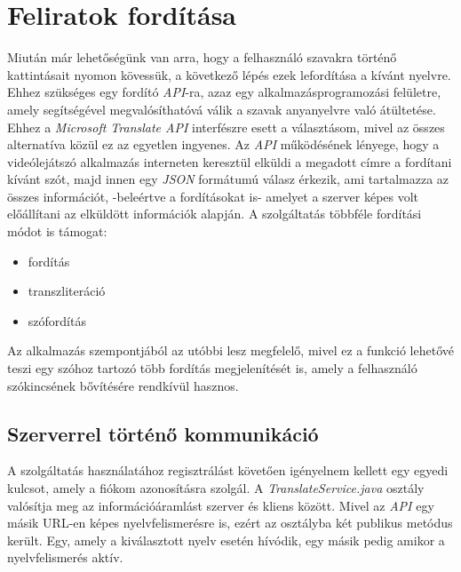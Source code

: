 \section{Feliratok fordítása}

Miután már lehetőségünk van arra, hogy a felhasználó szavakra történő kattintásait nyomon kövessük, a következő lépés ezek lefordítása a kívánt nyelvre. Ehhez szükséges egy fordító \textit{API}-ra, azaz egy alkalmazásprogramozási felületre, amely segítségével megvalósíthatóvá válik a szavak anyanyelvre való átültetése. Ehhez a \textit{Microsoft Translate API} interfészre esett a választásom, mivel az összes alternatíva közül ez az egyetlen ingyenes. Az \textit{API} működésének lényege, hogy a videólejátszó alkalmazás interneten keresztül elküldi a megadott címre a fordítani kívánt szót, majd innen egy \textit{JSON} formátumú válasz érkezik, ami tartalmazza az összes információt, -beleértve a fordításokat is- amelyet a szerver képes volt előállítani az elküldött információk alapján.
A szolgáltatás többféle fordítási módot is támogat:
\begin{itemize}[noitemsep]
\item fordítás
\item transzliteráció
\item szófordítás
\end{itemize}
Az alkalmazás szempontjából az utóbbi lesz megfelelő, mivel ez a funkció lehetővé teszi egy szóhoz tartozó több fordítás megjelenítését is, amely a felhasználó szókincsének bővítésére rendkívül hasznos.

\subsection{Szerverrel történő kommunikáció}
A szolgáltatás használatához regisztrálást követően igényelnem kellett egy egyedi kulcsot, amely a fiókom azonosításra szolgál. A \textit{TranslateService.java} osztály valósítja meg az információáramlást szerver és kliens között. Mivel az \textit{API} egy másik URL-en képes nyelvfelismerésre is, ezért az osztályba két publikus metódus került. Egy, amely a kiválasztott nyelv esetén hívódik, egy másik pedig amikor a nyelvfelismerés aktív. 

